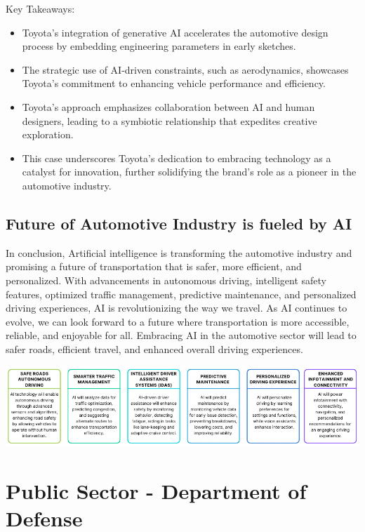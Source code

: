\documentclass[
]{article}
\begin{document}
Key Takeaways:

\begin{itemize}
\item
  Toyota's integration of generative AI accelerates the automotive design process by embedding engineering parameters in early sketches.
\item
  The strategic use of AI-driven constraints, such as aerodynamics, showcases Toyota's commitment to enhancing vehicle performance and efficiency.
\item
  Toyota's approach emphasizes collaboration between AI and human designers, leading to a symbiotic relationship that expedites creative exploration.
\item
  This case underscores Toyota's dedication to embracing technology as a catalyst for innovation, further solidifying the brand's role as a pioneer in the automotive industry.
\end{itemize}

\hypertarget{future-of-automotive-industry-is-fueled-by-ai}{%
\subsection{Future of Automotive Industry is fueled by AI}\label{future-of-automotive-industry-is-fueled-by-ai}}

In conclusion, Artificial intelligence is transforming the automotive industry and promising a future of transportation that is safer, more efficient, and personalized. With advancements in autonomous driving, intelligent safety features, optimized traffic management, predictive maintenance, and personalized driving experiences, AI is revolutionizing the way we travel. As AI continues to evolve, we can look forward to a future where transportation is more accessible, reliable, and enjoyable for all. Embracing AI in the automotive sector will lead to safer roads, efficient travel, and enhanced overall driving experiences.

\includegraphics{Canva.png}

\hypertarget{public-sector---department-of-defense}{%
\section{Public Sector - Department of Defense}\label{public-sector---department-of-defense}}
\end{document}

